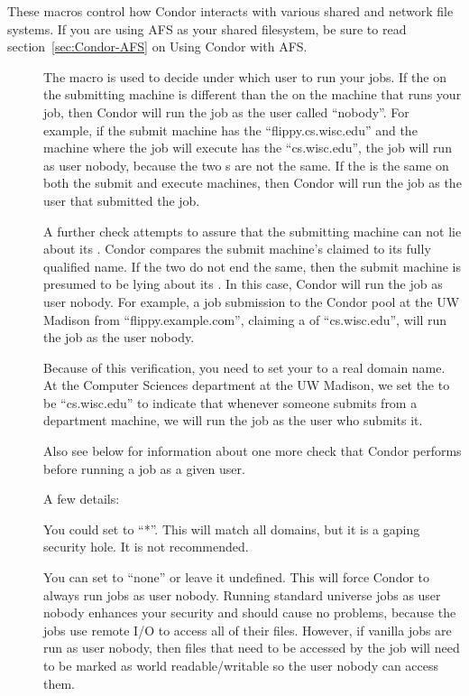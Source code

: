 These macros control how Condor interacts with various shared and
network file systems.  If you are using AFS as your shared filesystem,
be sure to read section~\ref{sec:Condor-AFS} on Using Condor with
AFS.
\begin{description}

\item[] \label{param:UidDomain}
The  macro
is used to decide under which user to run your jobs.
If the 
on the submitting machine is different than
the 
on the machine that runs your job, then Condor will run
the job as the user called ``nobody''.
For example, if the submit machine has
the 
``flippy.cs.wisc.edu'' and the machine where the job will execute
has the 
``cs.wisc.edu'', the job will run as user nobody, because
the two s are not the same.
If the 
is the same on both the submit and execute machines,
then Condor will run the job as the user that submitted the job.

A further check attempts to assure that the submitting
machine can not lie about its .
Condor compares the 
submit machine's claimed 
to its fully qualified name.
If the two do not end the same, then the submit machine
is presumed to be lying about its .
In this case, Condor will run the job as user nobody.
For example, a job submission to the Condor pool at the UW Madison
from ``flippy.example.com'', claiming a 
of ``cs.wisc.edu'',
will run the job as the user nobody.

Because of this verification, you need to set your
to a real domain name. At the Computer Sciences department
at the UW Madison, we set the 
to be ``cs.wisc.edu'' to
indicate that whenever someone submits from a department machine, we
will run the job as the user who submits it.

Also see 
below for information about one more check
that Condor performs before running a job as a given user.

A few details:

You could set 
to ``*''. This will match all domains,
but it is a gaping security hole. It is not recommended.

You can set 
to ``none'' or leave it undefined. This will
force Condor to always run jobs as user nobody.
Running standard universe jobs as user nobody enhances
your security and should cause no problems, because the jobs use remote
I/O to access all of their files.
However, if vanilla jobs are run as
user nobody, then files that need to be accessed by the job will need
to be marked as world readable/writable so the user nobody can access
them.


\end{description}

